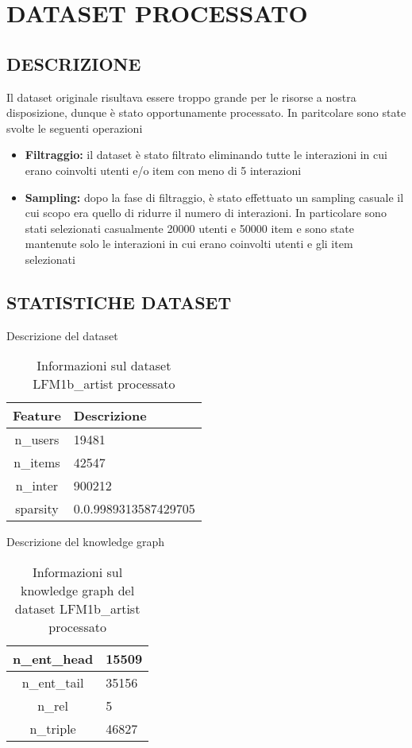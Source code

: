 \section*{DATASET PROCESSATO}

\subsection*{DESCRIZIONE}

\noindent Il dataset originale risultava essere troppo grande per le risorse a nostra disposizione, dunque è stato opportunamente processato. In paritcolare sono state svolte le seguenti operazioni
\begin{itemize}
    \item \textbf{Filtraggio:} il dataset è stato filtrato eliminando tutte le interazioni in cui erano coinvolti utenti e/o item con meno di 5 interazioni
    \item \textbf{Sampling:} dopo la fase di filtraggio, è stato effettuato un sampling casuale il cui scopo era quello di ridurre il numero di interazioni. In particolare sono stati selezionati casualmente 20000 utenti e 50000 item e sono state mantenute solo le interazioni in cui erano coinvolti utenti e gli item selezionati
\end{itemize}

\subsection*{STATISTICHE DATASET}


Descrizione del dataset
\begin{table}[H]
    \centering
    \footnotesize
    \begin{tabularx}{\textwidth}{|c|X|}
        \hline
        \textbf{Feature} & \textbf{Descrizione} \\
        \hline
        n\_users & 19481 \\
        \hline
        n\_items & 42547 \\
        \hline
        n\_inter & 900212 \\
        \hline
        sparsity & 0.0.9989313587429705 \\
        \hline
    \end{tabularx}
    \caption{Informazioni sul dataset LFM1b\_artist processato}
    \label{tab:dataset_info}
\end{table}


\noindent Descrizione del knowledge graph
\begin{table}[H]
    \centering
    \footnotesize
    \begin{tabularx}{\textwidth}{|c|X|}
        \hline
        n\_ent\_head & 15509 \\
        \hline
        n\_ent\_tail & 35156 \\
        \hline
        n\_rel & 5 \\
        \hline
        n\_triple & 46827 \\
        \hline
    \end{tabularx}
    \caption{Informazioni sul knowledge graph del dataset LFM1b\_artist processato}
    \label{tab:dataset_info}
\end{table}

